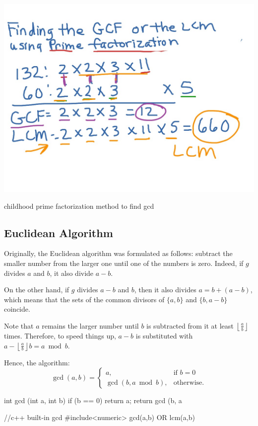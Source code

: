\begin{marginfigure}
    \includegraphics[width=\marginparwidth]{../resources/gcd_lcm.jpg}
    \caption{childhood prime factorization method to find gcd}
\end{marginfigure}

\subsection{Euclidean Algorithm}

Originally, the Euclidean algorithm was formulated as follows: subtract the smaller number from the larger one until one of the numbers is zero. Indeed, if $g$ divides $a$ and $b$, it also divide $a-b$.

On the other hand, if $g$ divides $a-b$ and $b$, then it also divides  $a = b + (a-b)$, which means that the sets of the common divisors of $\{a, b\}$ and $\{b,a-b\}$ coincide.

Note that $a$ remains the larger number until $b$ is subtracted from it at least $\left\lfloor\frac{a}{b}\right\rfloor$ times. Therefore, to speed things up, $a-b$ is substituted with $a-\left\lfloor\frac{a}{b}\right\rfloor b = a \bmod b$. 

Hence, the algorithm:
$$ \gcd(a, b) = \begin{cases}a,&\text{if }b = 0 \\ \gcd(b, a \bmod b),&\text{otherwise.}\end{cases} $$

\begin{code2}
    int gcd (int a, int b) {
        if (b == 0) return a;
        return gcd (b, a %
    }

    //c++ built-in gcd
    #include<numeric>
    gcd(a,b) OR lcm(a,b)
\end{code2}

